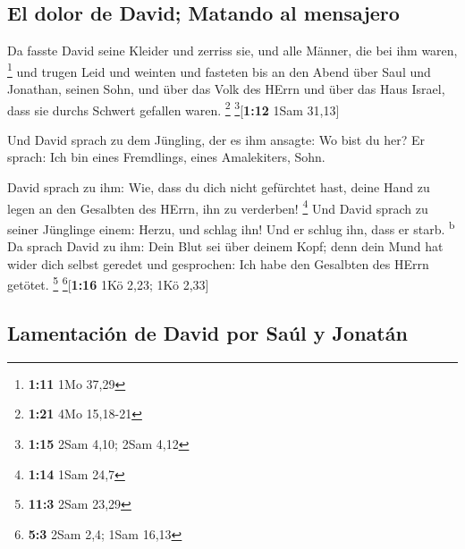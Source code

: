 \hypertarget{el-dolor-de-david-matando-al-mensajero}{%
\subsection{El dolor de David; Matando al
mensajero}\label{el-dolor-de-david-matando-al-mensajero}}

 Da fasste David seine Kleider und zerriss sie, und alle
Männer, die bei ihm waren, \footnote{\textbf{1:11} 1Mo 37,29}
 und trugen Leid und weinten und fasteten bis an den
Abend über Saul und Jonathan, seinen Sohn, und über das Volk des HErrn
und über das Haus Israel, dass sie durchs Schwert gefallen waren.
\footnote{\textbf{1:21} 4Mo 15,18-21} \footnote{\textbf{1:15} 2Sam 4,10;
  2Sam 4,12}{[}\textbf{1:12} 1Sam 31,13{]}

 Und David sprach zu dem Jüngling, der es ihm ansagte: Wo
bist du her? Er sprach: Ich bin eines Fremdlings, eines Amalekiters,
Sohn.

 David sprach zu ihm: Wie, dass du dich nicht gefürchtet
hast, deine Hand zu legen an den Gesalbten des HErrn, ihn zu verderben!
\footnote{\textbf{1:14} 1Sam 24,7}  Und David sprach zu
seiner Jünglinge einem: Herzu, und schlag ihn! Und er schlug ihn, dass
er starb. \textsuperscript{b}  Da sprach David zu ihm:
Dein Blut sei über deinem Kopf; denn dein Mund hat wider dich selbst
geredet und gesprochen: Ich habe den Gesalbten des HErrn getötet.
\footnote{\textbf{11:3} 2Sam 23,29} \footnote{\textbf{5:3} 2Sam 2,4;
  1Sam 16,13}{[}\textbf{1:16} 1Kö 2,23; 1Kö 2,33{]}

\hypertarget{lamentaciuxf3n-de-david-por-sauxfal-y-jonatuxe1n}{%
\subsection{Lamentación de David por Saúl y
Jonatán}\label{lamentaciuxf3n-de-david-por-sauxfal-y-jonatuxe1n}}

